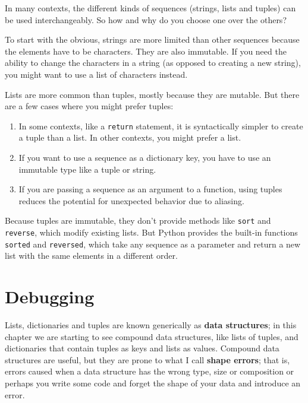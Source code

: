 \documentclass[10pt]{book}
\begin{document}
In many contexts, the different kinds of sequences (strings, lists and
tuples) can be used interchangeably.  So how and why do you choose one
over the others?


To start with the obvious, strings are more limited than other
sequences because the elements have to be characters.  They are
also immutable.  If you need the ability to change the characters
in a string (as opposed to creating a new string), you might
want to use a list of characters instead.

Lists are more common than tuples, mostly because they are mutable.
But there are a few cases where you might prefer tuples:

\begin{enumerate}

\item In some contexts, like a {\tt return} statement, it is
syntactically simpler to create a tuple than a list.  In other
contexts, you might prefer a list.

\item If you want to use a sequence as a dictionary key, you
have to use an immutable type like a tuple or string.

\item If you are passing a sequence as an argument to a function,
using tuples reduces the potential for unexpected behavior
due to aliasing.

\end{enumerate}

Because tuples are immutable, they don't provide methods
like {\tt sort} and {\tt reverse}, which modify existing lists.
But Python provides the built-in functions {\tt sorted}
and {\tt reversed}, which take any sequence as a parameter
and return a new list with the same elements in a different
order.



\section{Debugging}


Lists, dictionaries and tuples are known generically as {\bf data
  structures}; in this chapter we are starting to see compound data
structures, like lists of tuples, and dictionaries that contain tuples
as keys and lists as values.  Compound data structures are useful, but
they are prone to what I call {\bf shape errors}; that is, errors
caused when a data structure has the wrong type, size or composition
or perhaps you write some code and forget the shape of your data
and introduce an error.
\end{document}
